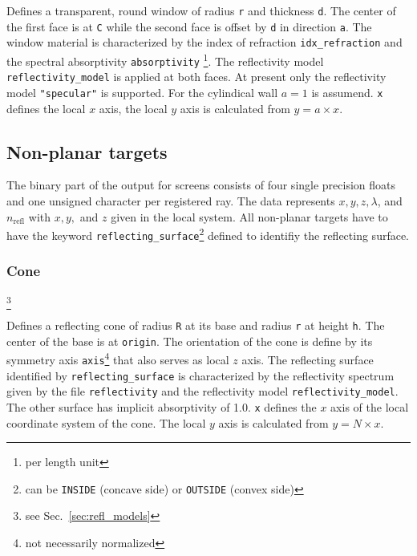 \documentclass[10pt,a4paper,titlepage]{article}
\begin{document}
\vspace{0.25cm}
Defines a transparent, round window of radius {\tt r} and thickness {\tt d}. The center of the first face is at {\tt C} while the second face is offset by {\tt d} in direction {\tt a}. The window material is characterized by the index of refraction {\tt idx\_refraction} and the spectral absorptivity {\tt absorptivity} \footnote{per length unit}. The reflectivity model {\tt reflectivity\_model} is applied at both faces. At present only the reflectivity model {\tt "specular"} is supported. For the cylindical wall $a=1$ is assumend. {\tt x} defines the local $x$ axis, the local $y$ axis is calculated from $y = a \times x$.



\subsection{Non-planar targets}

The binary part of the output for screens consists of four single precision floats and one unsigned character per registered ray. The data represents $x, y, z, \lambda$, and $n_{\mathrm{refl}}$ with $x, y,$ and $z$ given in the local system. All non-planar targets have to have the keyword {\tt reflecting\_surface}\footnote{can be {\tt INSIDE} (concave side) or {\tt OUTSIDE} (convex side)} defined to identifiy the reflecting surface.

\subsubsection{Cone}









\footnote{see Sec.~\ref{sec:refl_models}}


\vspace{0.25cm}
Defines a reflecting cone of radius {\tt R} at its base and radius {\tt r} at height {\tt h}. The center of the base is at {\tt origin}. The orientation of the cone is define by its symmetry axis {\tt axis}\footnote{not necessarily normalized} that also serves as local $z$ axis. The reflecting surface identified by {\tt reflecting\_surface} is characterized by the reflectivity spectrum given by the file {\tt reflectivity} and the reflectivity model {\tt reflectivity\_model}. The other surface has implicit absorptivity of 1.0. {\tt x} defines the $x$ axis of the local coordinate system of the cone. The local $y$ axis is calculated from $y = N \times x$.
\end{document}
